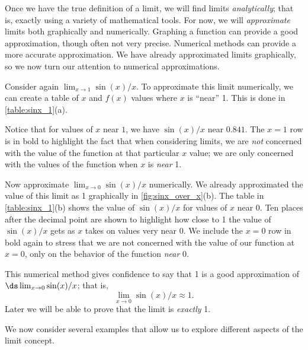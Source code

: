 Once we have the true definition of a limit, we will find limits \textit{analytically}; that is, exactly using a variety of mathematical tools. For now, we will \textit{approximate} limits both graphically and numerically. Graphing a function can provide a good approximation, though often not very precise. Numerical methods can provide a more accurate approximation. We have already approximated limits graphically, so we now turn our attention to numerical approximations.

Consider again $\lim_{x\to 1}\sin (x)/x$. To approximate this limit numerically, we can create a table of $x$ and $f(x)$ values where $x$ is ``near'' 1. This is done in \autoref{table:sinx_1}(a).

Notice that for values of $x$ near $1$, we have $\sin (x)/x$ near $0.841$. The $x=1$ row is in bold to highlight the fact that when considering limits, we are \textit{not} concerned with the value of the function at that particular $x$ value; we are only concerned with the values of the function when $x$ is \textit{near} 1. 

Now approximate $\lim_{x\to 0} \sin(x)/x$ numerically. We already approximated the value of this limit as 1 graphically in \autoref{fig:sinx_over_x}(b). The table in \autoref{table:sinx_1}(b) shows the value of $\sin(x)/x$ for values of $x$ near 0. Ten places after the decimal point are shown to highlight how close to 1 the value of $\sin(x)/x$ gets as $x$ takes on values very near 0. We include the $x=0$ row in bold again to stress that we are not concerned with the value of our function at $x=0$, only on the behavior of the function \textit{near} 0. 

This numerical method gives confidence to say that 1 is a good approximation of $\ds\lim_{x\to 0} \sin(x)/x$; that is,
\[\lim_{x\to 0} \sin(x)/x \approx 1.\]
Later we will be able to prove that the limit is \textit{exactly} 1.


We now consider several examples that allow us to explore different aspects of the limit concept.

